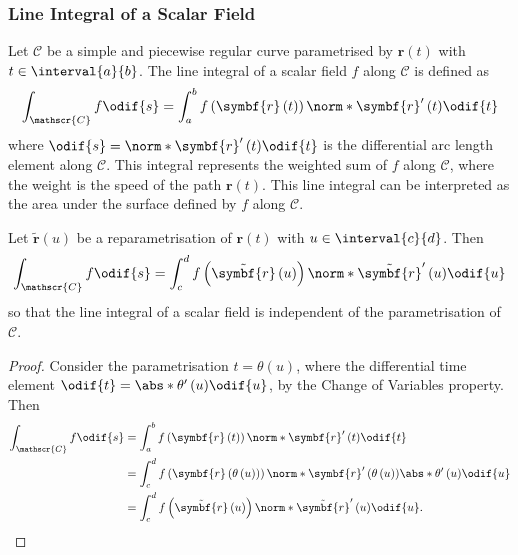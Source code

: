 \documentclass{article}
\begin{document}
\subsubsection{Line Integral of a Scalar Field}
Let \(\mathscr{C}\) be a simple and piecewise regular curve
parametrised by \(\symbf{r}\left( t \right)\) with \(t \in
\interval{a}{b}\). The line integral of a scalar field \(f\) along
\(\mathscr{C}\) is defined as
\begin{equation*}
    \int_{\mathscr{C}} f \odif{s} = \int_a^b f\left( \symbf{r}\left( t \right) \right) \norm*{\symbf{r}'\left( t \right)} \odif{t}
\end{equation*}
where \(\odif{s} = \norm*{\symbf{r}'\left( t \right)} \odif{t}\) is the
differential arc length element along \(\mathscr{C}\).
This integral represents the weighted sum of \(f\) along
\(\mathscr{C}\), where the weight is the speed of the path
\(\symbf{r}\left( t \right)\). This line integral can be interpreted as
the area under the surface defined by \(f\) along \(\mathscr{C}\).
\begin{lemma}
    Let \(\tilde{\symbf{r}}\left( u \right)\) be a
    reparametrisation of \(\symbf{r}\left( t \right)\) with \(u \in
    \interval{c}{d}\). Then
    \begin{equation*}
        \int_{\mathscr{C}} f \odif{s} = \int_c^d f\left( \tilde{\symbf{r}}\left( u \right) \right) \norm*{\tilde{\symbf{r}}'\left( u \right)} \odif{u}
    \end{equation*}
    so that the line integral of a scalar field is independent of the
    parametrisation of \(\mathscr{C}\).
\end{lemma}
\begin{proof}
    Consider the parametrisation \(t = \theta\left( u \right)\),
    where the differential time element
    \(\odif{t} = \abs*{\theta'\left( u \right)} \odif{u}\), by the
    Change of Variables property. Then
    \begin{align*}
        \int_{\mathscr{C}} f \odif{s} & = \int_a^b f\left( \symbf{r}\left( t \right) \right) \norm*{\symbf{r}'\left( t \right)} \odif{t}                                                                          \\
                                      & = \int_c^d f\left( \symbf{r}\left( \theta\left( u \right) \right) \right) \norm*{\symbf{r}'\left( \theta\left( u \right) \right)} \abs*{\theta'\left( u \right)} \odif{u} \\
                                      & = \int_c^d f\left( \tilde{\symbf{r}}\left( u \right) \right) \norm*{\tilde{\symbf{r}}'\left( u \right)} \odif{u}.
    \end{align*}
\end{proof}
\end{document}
